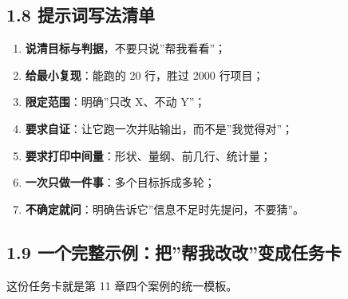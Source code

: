 \subsection{1.8
提示词写法清单}\label{ux63d0ux793aux8bcdux5199ux6cd5ux6e05ux5355}

\begin{enumerate}
\def\labelenumi{\arabic{enumi}.}
\tightlist
\item
  \textbf{说清目标与判据}，不要只说''帮我看看''；
\item
  \textbf{给最小复现}：能跑的 20 行，胜过 2000 行项目；
\item
  \textbf{限定范围}：明确''只改 X、不动 Y''；
\item
  \textbf{要求自证}：让它跑一次并贴输出，而不是''我觉得对''；
\item
  \textbf{要求打印中间量}：形状、量纲、前几行、统计量；
\item
  \textbf{一次只做一件事}：多个目标拆成多轮；
\item
  \textbf{不确定就问}：明确告诉它''信息不足时先提问，不要猜''。
\end{enumerate}

\subsection{1.9
一个完整示例：把''帮我改改''变成任务卡}\label{ux4e00ux4e2aux5b8cux6574ux793aux4f8bux628aux5e2eux6211ux6539ux6539ux53d8ux6210ux4efbux52a1ux5361}

\begin{Shaded}
\begin{Highlighting}[]
\end{Highlighting}
\end{Shaded}

这份任务卡就是第 11 章四个案例的统一模板。

